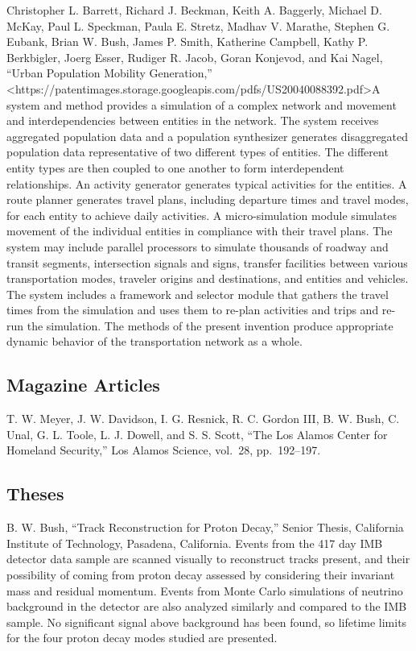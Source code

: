 \documentclass[]{article}
\begin{document}
Christopher L. Barrett, Richard J. Beckman, Keith A. Baggerly, Michael
D. McKay, Paul L. Speckman, Paula E. Stretz, Madhav V. Marathe, Stephen
G. Eubank, Brian W. Bush, James P. Smith, Katherine Campbell, Kathy P.
Berkbigler, Joerg Esser, Rudiger R. Jacob, Goran Konjevod, and Kai
Nagel, ``Urban Population Mobility Generation,''
\textless{}https://patentimages.storage.googleapis.com/pdfs/US20040088392.pdf\textgreater{}A
system and method provides a simulation of a complex network and
movement and interdependencies between entities in the network. The
system receives aggregated population data and a population synthesizer
generates disaggregated population data representative of two different
types of entities. The different entity types are then coupled to one
another to form interdependent relationships. An activity generator
generates typical activities for the entities. A route planner generates
travel plans, including departure times and travel modes, for each
entity to achieve daily activities. A micro-simulation module simulates
movement of the individual entities in compliance with their travel
plans. The system may include parallel processors to simulate thousands
of roadway and transit segments, intersection signals and signs,
transfer facilities between various transportation modes, traveler
origins and destinations, and entities and vehicles. The system includes
a framework and selector module that gathers the travel times from the
simulation and uses them to re-plan activities and trips and re-run the
simulation. The methods of the present invention produce appropriate
dynamic behavior of the transportation network as a whole.

\subsection{Magazine Articles}\label{magazine-articles}

T. W. Meyer, J. W. Davidson, I. G. Resnick, R. C. Gordon III, B. W.
Bush, C. Unal, G. L. Toole, L. J. Dowell, and S. S. Scott, ``The Los
Alamos Center for Homeland Security,'' Los Alamos Science, vol.~28,
pp.~192--197.

\subsection{Theses}\label{theses}

B. W. Bush, ``Track Reconstruction for Proton Decay,'' Senior Thesis,
California Institute of Technology, Pasadena, California. Events from
the 417 day IMB detector data sample are scanned visually to reconstruct
tracks present, and their possibility of coming from proton decay
assessed by considering their invariant mass and residual momentum.
Events from Monte Carlo simulations of neutrino background in the
detector are also analyzed similarly and compared to the IMB sample. No
significant signal above background has been found, so lifetime limits
for the four proton decay modes studied are presented.
\end{document}
